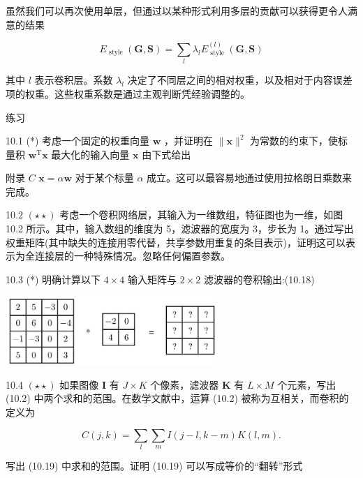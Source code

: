 \documentclass[10pt]{report}
\begin{document}
虽然我们可以再次使用单层，但通过以某种形式利用多层的贡献可以获得更令人满意的结果

\[
{E}_{\text{ style }}\left( {\mathbf{G},\mathbf{S}}\right)  = \mathop{\sum }\limits_{l}{\lambda }_{l}{E}_{\text{ style }}^{\left( l\right) }\left( {\mathbf{G},\mathbf{S}}\right)  \tag{10.17}
\]

其中 \(l\) 表示卷积层。系数 \({\lambda }_{l}\) 决定了不同层之间的相对权重，以及相对于内容误差项的权重。这些权重系数是通过主观判断凭经验调整的。

练习

10.1 (*) 考虑一个固定的权重向量 \(\mathbf{w}\) ，并证明在 \(\parallel \mathbf{x}{\parallel }^{2}\) 为常数的约束下，使标量积 \({\mathbf{w}}^{\mathrm{T}}\mathbf{x}\) 最大化的输入向量 \(\mathbf{x}\) 由下式给出

附录 \(C\)  \(\mathbf{x} = \alpha \mathbf{w}\) 对于某个标量 \(\alpha\) 成立。这可以最容易地通过使用拉格朗日乘数来完成。

10.2 \(\left( {\star  \star  }\right)\) 考虑一个卷积网络层，其输入为一维数组，特征图也为一维，如图 10.2 所示。其中，输入数组的维度为 5，滤波器的宽度为 3，步长为 1。通过写出权重矩阵(其中缺失的连接用零代替，共享参数用重复的条目表示)，证明这可以表示为全连接层的一种特殊情况。忽略任何偏置参数。

10.3 (*) 明确计算以下 \(4 \times  4\) 输入矩阵与 \(2 \times  2\) 滤波器的卷积输出:(10.18)

\begin{center}
\includegraphics[max width=0.6\textwidth]{images/0194e279-9b28-703a-88f4-c3ac21e2010d_341_581_885_756_247_0.jpg}
\end{center}
\hspace*{3em} 

10.4 \(\left( {\star  \star  }\right)\) 如果图像 \(\mathbf{I}\) 有 \(J \times  K\) 个像素，滤波器 \(\mathbf{K}\) 有 \(L \times  M\) 个元素，写出 (10.2) 中两个求和的范围。在数学文献中，运算 (10.2) 被称为互相关，而卷积的定义为

\[
C\left( {j,k}\right)  = \mathop{\sum }\limits_{l}\mathop{\sum }\limits_{m}I\left( {j - l,k - m}\right) K\left( {l,m}\right) . \tag{10.19}
\]

写出 (10.19) 中求和的范围。证明 (10.19) 可以写成等价的“翻转”形式
\end{document}
